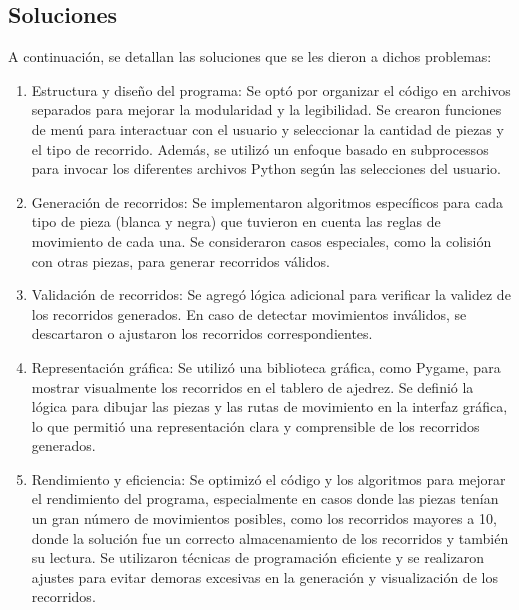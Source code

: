 \subsection{Soluciones}
A continuación, se detallan las soluciones que se les dieron a dichos problemas:
\begin{enumerate}
    \item Estructura y diseño del programa: Se optó por organizar el código en archivos separados para mejorar la modularidad y la legibilidad. Se crearon funciones de menú para interactuar con el usuario y seleccionar la cantidad de piezas y el tipo de recorrido. Además, se utilizó un enfoque basado en subprocessos para invocar los diferentes archivos Python según las selecciones del usuario.\newline 

    \item Generación de recorridos: Se implementaron algoritmos específicos para cada tipo de pieza (blanca y negra) que tuvieron en cuenta las reglas de movimiento de cada una. Se consideraron casos especiales, como la colisión con otras piezas, para generar recorridos válidos.\newline 
    
    \item Validación de recorridos: Se agregó lógica adicional para verificar la validez de los recorridos generados. En caso de detectar movimientos inválidos, se descartaron o ajustaron los recorridos correspondientes.\newline 
    
    \item Representación gráfica: Se utilizó una biblioteca gráfica, como Pygame, para mostrar visualmente los recorridos en el tablero de ajedrez. Se definió la lógica para dibujar las piezas y las rutas de movimiento en la interfaz gráfica, lo que permitió una representación clara y comprensible de los recorridos generados.\newline 
    
    \item Rendimiento y eficiencia: Se optimizó el código y los algoritmos para mejorar el rendimiento del programa, especialmente en casos donde las piezas tenían un gran número de movimientos posibles, como los recorridos mayores a 10, donde la solución fue un correcto almacenamiento de los recorridos y también su lectura. Se utilizaron técnicas de programación eficiente y se realizaron ajustes para evitar demoras excesivas en la generación y visualización de los recorridos.\newline 
\end{enumerate}
 \newline 
